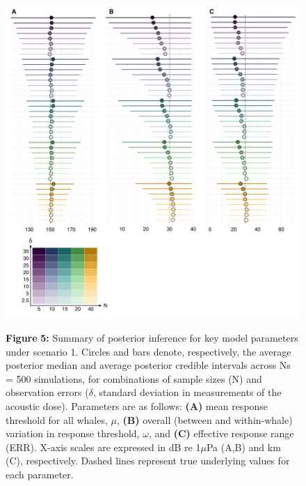 \documentclass[
]{article}
\begin{document}
\begin{figure}

{\centering \includegraphics[width=1\linewidth]{fig/fig_forestplot_S1} 

}

\textbf{Figure }{\textbf{5:} \hypertarget{fig5}{}Summary of posterior inference for key model parameters under scenario 1. Circles and bars denote, respectively, the average posterior median and average posterior credible intervals across Ns = 500 simulations, for combinations of sample sizes (N) and observation errors (\(\delta\), standard deviation in measurements of the acoustic dose). Parameters are as follows: \textbf{(A)} mean response threshold for all whales, \(\mu\), \textbf{(B)} overall (between and within-whale) variation in response threshold, \(\omega\), and \textbf{(C)} effective response range (ERR). X-axis scales are expressed in dB re 1\(\mu\)Pa (A,B) and km (C), respectively. Dashed lines represent true underlying values for each parameter.}\label{fig:unnamed-chunk-4}
\end{figure}
\end{document}
